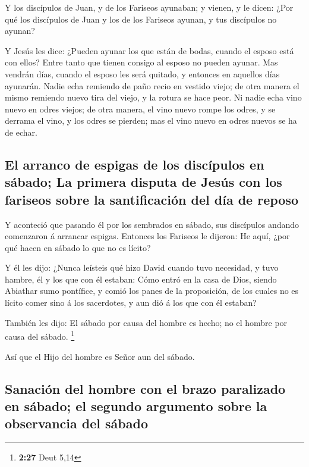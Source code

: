  Y los discípulos de Juan, y de los Fariseos ayunaban; y
vienen, y le dicen: ¿Por qué los discípulos de Juan y los de los
Fariseos ayunan, y tus discípulos no ayunan?

 Y Jesús les dice: ¿Pueden ayunar los que están de bodas,
cuando el esposo está con ellos? Entre tanto que tienen consigo al
esposo no pueden ayunar.  Mas vendrán días, cuando el
esposo les será quitado, y entonces en aquellos días ayunarán.
 Nadie echa remiendo de paño recio en vestido viejo; de
otra manera el mismo remiendo nuevo tira del viejo, y la rotura se hace
peor.  Ni nadie echa vino nuevo en odres viejos; de otra
manera, el vino nuevo rompe los odres, y se derrama el vino, y los odres
se pierden; mas el vino nuevo en odres nuevos se ha de echar.

\hypertarget{el-arranco-de-espigas-de-los-discuxedpulos-en-suxe1bado-la-primera-disputa-de-jesuxfas-con-los-fariseos-sobre-la-santificaciuxf3n-del-duxeda-de-reposo}{%
\subsection{El arranco de espigas de los discípulos en sábado; La
primera disputa de Jesús con los fariseos sobre la santificación del día
de
reposo}\label{el-arranco-de-espigas-de-los-discuxedpulos-en-suxe1bado-la-primera-disputa-de-jesuxfas-con-los-fariseos-sobre-la-santificaciuxf3n-del-duxeda-de-reposo}}

 Y aconteció que pasando él por los sembrados en sábado,
sus discípulos andando comenzaron á arrancar espigas. 
Entonces los Fariseos le dijeron: He aquí, ¿por qué hacen en sábado lo
que no es lícito?

 Y él les dijo: ¿Nunca leísteis qué hizo David cuando tuvo
necesidad, y tuvo hambre, él y los que con él estaban: 
Cómo entró en la casa de Dios, siendo Abiathar sumo pontífice, y comió
los panes de la proposición, de los cuales no es lícito comer sino á los
sacerdotes, y aun dió á los que con él estaban?

 También les dijo: El sábado por causa del hombre es hecho;
no el hombre por causa del sábado. \footnote{\textbf{2:27} Deut 5,14}

 Así que el Hijo del hombre es Señor aun del sábado.

\hypertarget{sanaciuxf3n-del-hombre-con-el-brazo-paralizado-en-suxe1bado-el-segundo-argumento-sobre-la-observancia-del-suxe1bado}{%
\subsection{Sanación del hombre con el brazo paralizado en sábado; el
segundo argumento sobre la observancia del
sábado}\label{sanaciuxf3n-del-hombre-con-el-brazo-paralizado-en-suxe1bado-el-segundo-argumento-sobre-la-observancia-del-suxe1bado}}

